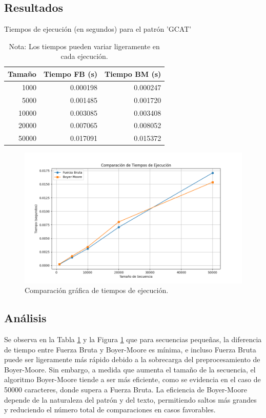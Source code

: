 \documentclass[fleqn,10pt]{article}
\begin{document}
\subsection{Resultados}
\begin{table}[h!]
    \centering
    \caption{Tiempos de ejecución (en segundos) para el patrón 'GCAT'}
    \label{tab:tiempos}
    \begin{tabular}{rrr}
        \toprule
        Tamaño    & Tiempo FB (s) & Tiempo BM (s) \\
        \midrule
        1000      & 0.000198      & 0.000247      \\
        5000      & 0.001485      & 0.001720      \\
        10000     & 0.003085      & 0.003408      \\
        20000     & 0.007065      & 0.008052      \\
        50000     & 0.017091      & 0.015372      \\
        \bottomrule
    \end{tabular}
    \caption*{Nota: Los tiempos pueden variar ligeramente en cada ejecución.}
\end{table}

\begin{figure}[h!]
    \centering
    \includegraphics[width=0.7\linewidth]{grafico_comparacion.png}
    \caption{Comparación gráfica de tiempos de ejecución.}
    \label{fig:comparacion_tiempos}
\end{figure}

\subsection{Análisis}
Se observa en la Tabla \ref{tab:tiempos} y la Figura \ref{fig:comparacion_tiempos} que para secuencias pequeñas, la diferencia de tiempo entre Fuerza Bruta y Boyer-Moore es mínima, e incluso Fuerza Bruta puede ser ligeramente más rápido debido a la sobrecarga del preprocesamiento de Boyer-Moore. Sin embargo, a medida que aumenta el tamaño de la secuencia, el algoritmo Boyer-Moore tiende a ser más eficiente, como se evidencia en el caso de 50000 caracteres, donde supera a Fuerza Bruta. La eficiencia de Boyer-Moore depende de la naturaleza del patrón y del texto, permitiendo saltos más grandes y reduciendo el número total de comparaciones en casos favorables.
\end{document}
